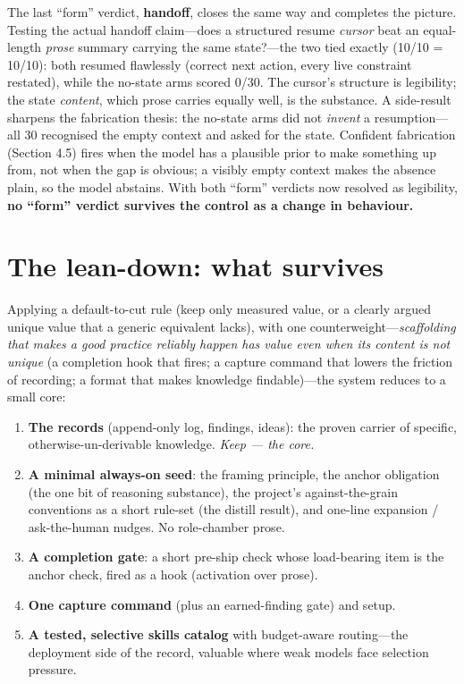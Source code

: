 \documentclass[11pt]{article}
\begin{document}
The last ``form'' verdict, \textbf{handoff}, closes the same way and completes the picture.
Testing the actual handoff claim---does a structured resume \emph{cursor} beat an equal-length
\emph{prose} summary carrying the same state?---the two tied exactly (10/10 = 10/10): both
resumed flawlessly (correct next action, every live constraint restated), while the
no-state arms scored 0/30. The cursor's structure is legibility; the state \emph{content},
which prose carries equally well, is the substance. A side-result sharpens the fabrication
thesis: the no-state arms did not \emph{invent} a resumption---all 30 recognised the empty
context and asked for the state. Confident fabrication (Section 4.5) fires when the model
has a plausible prior to make something up from, not when the gap is obvious; a visibly
empty context makes the absence plain, so the model abstains. With both ``form'' verdicts
now resolved as legibility, \textbf{no ``form'' verdict survives the control as a change in
behaviour.}

\section{The lean-down: what survives}

Applying a default-to-cut rule (keep only measured value, or a clearly argued unique value
that a generic equivalent lacks), with one counterweight---\emph{scaffolding that makes a
good practice reliably happen has value even when its content is not unique} (a completion
hook that fires; a capture command that lowers the friction of recording; a format that
makes knowledge findable)---the system reduces to a small core:

\begin{enumerate}
\item \textbf{The records} (append-only log, findings, ideas): the proven carrier of specific,
   otherwise-un-derivable knowledge. \emph{Keep --- the core.}
\item \textbf{A minimal always-on seed}: the framing principle, the anchor obligation (the one
   bit of reasoning substance), the project's against-the-grain conventions as a short
   rule-set (the distill result), and one-line expansion / ask-the-human nudges. No
   role-chamber prose.
\item \textbf{A completion gate}: a short pre-ship check whose load-bearing item is the anchor
   check, fired as a hook (activation over prose).
\item \textbf{One capture command} (plus an earned-finding gate) and setup.
\item \textbf{A tested, selective skills catalog} with budget-aware routing---the deployment
   side of the record, valuable where weak models face selection pressure.
\end{enumerate}
\end{document}
